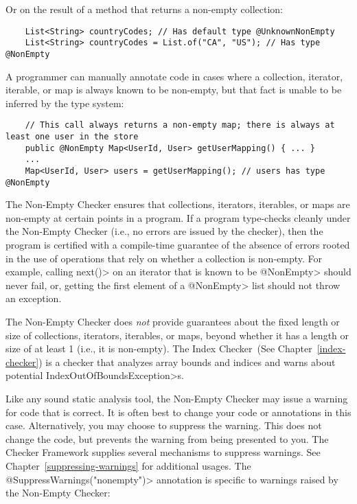 Or on the result of a method that returns a non-empty collection:

\begin{Verbatim}
    List<String> countryCodes; // Has default type @UnknownNonEmpty
    List<String> countryCodes = List.of("CA", "US"); // Has type @NonEmpty
\end{Verbatim}

A programmer can manually annotate code in cases where a collection,
iterator, iterable, or map is always known to be non-empty, but that fact is
unable to be inferred by the type system:

\begin{Verbatim}
    // This call always returns a non-empty map; there is always at least one user in the store
    public @NonEmpty Map<UserId, User> getUserMapping() { ... }
    ...
    Map<UserId, User> users = getUserMapping(); // users has type @NonEmpty
\end{Verbatim}


The Non-Empty Checker ensures that collections, iterators, iterables, or maps
are non-empty at certain points in a program.
If a program type-checks cleanly under the Non-Empty Checker (i.e., no errors
are issued by the checker), then the program is certified with a compile-time
guarantee of the absence of errors rooted in the use of operations that
rely on whether a collection is non-empty.
For example, calling \<next()> on an iterator that is known to be \<@NonEmpty>
should never fail, or, getting the first element of a \<@NonEmpty> list should
not throw an exception.

The Non-Empty Checker does \emph{not} provide guarantees about the fixed
length or size of collections, iterators, iterables, or maps, beyond whether
it has a length or size of at least 1 (i.e., it is non-empty).
The Index Checker~(See Chapter~\ref{index-checker}) is a checker that analyzes
array bounds and indices and warns about potential
\<IndexOutOfBoundsException>s.


Like any sound static analysis tool, the Non-Empty Checker may issue a warning
for code that is correct.
It is often best to change your code or annotations in this case.
Alternatively, you may choose to suppress the warning.
This does not change the code, but prevents the warning from being presented to
you.
The Checker Framework supplies several mechanisms to suppress warnings.
See Chapter~\ref{suppressing-warnings} for additional usages.
The \<@SuppressWarnings("nonempty")> annotation is specific to warnings raised
by the Non-Empty Checker:

